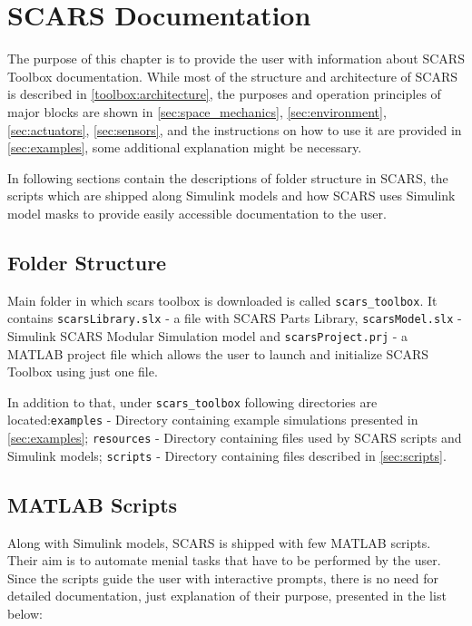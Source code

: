 \section{SCARS Documentation}\label{sec:documentation}
    The purpose of this chapter is to provide the user with information about SCARS Toolbox documentation. While most of the structure and architecture of SCARS is described in \autoref{toolbox:architecture}, the purposes and operation principles of major blocks are shown in \autoref{sec:space_mechanics}, \ref{sec:environment}, \ref{sec:actuators},  \ref{sec:sensors},   and the instructions on how to use it are provided in \autoref{sec:examples}, some additional explanation might be necessary. 
    
    In following sections contain the descriptions of folder structure in SCARS, the scripts which are shipped along Simulink models and how SCARS uses Simulink model masks to provide easily accessible documentation to the user.
    

    \subsection{Folder Structure}
        Main folder in which \ac{scars} toolbox is downloaded is called \verb|scars_toolbox|. It contains \verb|scarsLibrary.slx| - a file with SCARS Parts Library, \verb|scarsModel.slx| - Simulink SCARS Modular Simulation model and \verb|scarsProject.prj| - a MATLAB project file\cite{matlabproject} which allows the user to launch and initialize SCARS Toolbox using just one file.

        In \hfill addition \hfill to \hfill that, \hfill under \hfill \verb|scars_toolbox| \hfill following \hfill directories \hfill are \hfill located:\newline \verb|examples| - Directory containing example simulations presented in \autoref{sec:examples}; \verb|resources| - Directory containing files used by SCARS scripts and Simulink models; \verb|scripts| - Directory containing files described in \autoref{sec:scripts}.


    \subsection{MATLAB Scripts}\label{sec:scripts}
        Along with Simulink models, SCARS is shipped with few MATLAB scripts. Their aim is to automate menial tasks that have to be performed by the user. Since the scripts guide the user with interactive prompts, there is no need for detailed documentation, just explanation of their purpose, presented in the list below:
        
